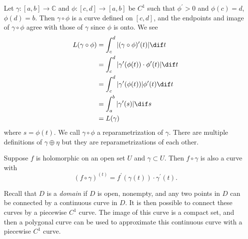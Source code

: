 Let $\gamma : [a, b] \to \mathbb{C}$ and
$\phi : [c, d] \to [a, b]$ be $C^1$ such that
$\phi^\prime > 0$ and $\phi(c) = d$, $\phi(d) = b$.
Then $\gamma \circ \phi$ is a curve defined on
$[c, d]$, and the endpoints and image of
$\gamma \circ \phi$ agree with those of $\gamma$
since $\phi$ is onto. We see
\begin{align*}
   L(\gamma \circ \phi)
&= \int_c^d |(\gamma \circ \phi)^\prime(t)| \dif t \\
&= \int_c^d |\gamma^{\prime}(\phi(t)) \cdot \phi^\prime(t)| \dif t \\
&= \int_c^d |\gamma^\prime(\phi(t))| \phi^\prime(t) \dif t \\
&= \int_a^b |\gamma^\prime(s)| \dif s \\
&= L(\gamma)
\end{align*}
where $s = \phi(t)$. We call $\gamma \circ \phi$ a reparametrization
of $\gamma$. There are multiple definitions of $\gamma \oplus \eta$
but they are reparametrizations of each other.

Suppose $f$ is holomorphic on an open set $U$ and $\gamma \subset U$.
Then $f \circ \gamma$ is also a curve with
$$
(f \circ \gamma)^(t) = f^\prime(\gamma(t)) \cdot \gamma^\prime(t).
$$

Recall that $D$ is a \emph{domain} if $D$ is open, nonempty, and
any two points in $D$ can be connected by a continuous
curve in $D$. It is then possible to connect these curves by
a piecewise $C^1$ curve. The image of this curve is a compact
set, and then a polygonal curve can be used to approximate this
continuous curve with a piecewise $C^1$ curve.
